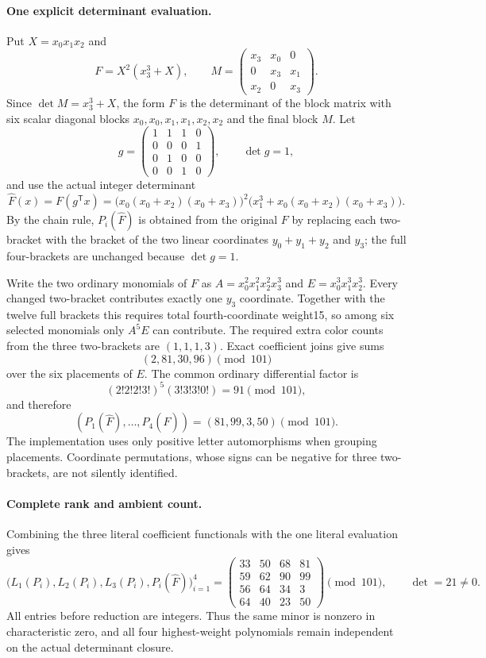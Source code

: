 \paragraph{One explicit determinant evaluation.}
Put $X=x_0x_1x_2$ and
\[
 F=X^2(x_3^3+X),\qquad
 M=\begin{pmatrix}x_3&x_0&0\\0&x_3&x_1\\x_2&0&x_3\end{pmatrix}.
\]
Since $\det M=x_3^3+X$, the form $F$ is the determinant of the
block matrix with six scalar diagonal blocks
$x_0,x_0,x_1,x_1,x_2,x_2$ and the final block $M$.
Let
\[
 g=\begin{pmatrix}
 1&1&1&0\\
 0&0&0&1\\
 0&1&0&0\\
 0&0&1&0
 \end{pmatrix},\qquad \det g=1,
\]
and use the actual integer determinant
\[
 \widehat F(x)=F(g^{\mathsf T}x)
  =\bigl(x_0(x_0+x_2)(x_0+x_3)\bigr)^2
    \bigl(x_1^3+x_0(x_0+x_2)(x_0+x_3)\bigr).                 \tag{S-011.8}
\]
By the chain rule, $P_i(\widehat F)$ is obtained from the original
$F$ by replacing each two-bracket with the bracket of the two
linear coordinates $y_0+y_1+y_2$ and $y_3$; the full four-brackets
are unchanged because $\det g=1$.

Write the two ordinary monomials of $F$ as
$A=x_0^2x_1^2x_2^2x_3^3$ and
$E=x_0^3x_1^3x_2^3$. Every changed two-bracket contributes exactly
one $y_3$ coordinate. Together with the twelve full brackets this
requires total fourth-coordinate weight15, so among six selected
monomials only $A^5E$ can contribute. The required extra color
counts from the three two-brackets are $(1,1,1,3)$.
Exact coefficient joins give sums
\[
                           (2,81,30,96)\pmod {101}
\]
over the six placements of $E$. The common ordinary differential
factor is
\[
 (2!2!2!3!)^5(3!3!3!0!)=91\pmod {101},
\]
and therefore
\[
                  (P_1(\widehat F),\ldots,P_4(\widehat F))
                       =(81,99,3,50)\pmod {101}.             \tag{S-011.9}
\]
The implementation uses only positive letter automorphisms when
grouping placements. Coordinate permutations, whose signs can be
negative for three two-brackets, are not silently identified.

\paragraph{Complete rank and ambient count.}
Combining the three literal coefficient functionals with the
one literal evaluation gives
\[
 \bigl(L_1(P_i),L_2(P_i),L_3(P_i),P_i(\widehat F)\bigr)_{i=1}^4
 =
 \begin{pmatrix}
 33&50&68&81\\
 59&62&90&99\\
 56&64&34&3\\
 64&40&23&50
 \end{pmatrix}
 \pmod {101},
 \qquad \det=21\ne0.                                        \tag{S-011.10}
\]
All entries before reduction are integers. Thus the same minor is
nonzero in characteristic zero, and all four highest-weight
polynomials remain independent on the actual determinant closure.

